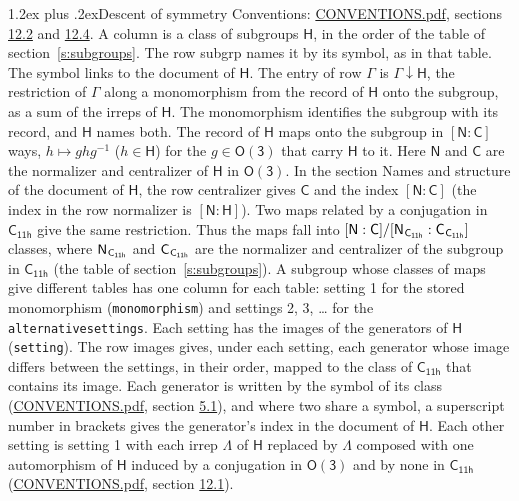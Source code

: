 \documentclass[10pt,a4paper]{article}
\makeatletter
\renewcommand\section{\@startsection{section}{1}{\z@}{-3ex plus -1ex minus -.2ex}%
  {1.2ex plus .2ex}{\normalfont\large\sffamily\bfseries\color{parttitle}}}
\numberwithin{equation}{section}
\newcommand{\grp}[1]{\mathsf{#1}}
\newcommand{\grpindex}[2]{[#1 : #2]}
\newcommand{\restr}[2]{#1\!\downarrow#2}
\newcommand{\hairsp}{\mkern1mu}
\makeatother
\begin{document}
\section{Descent of symmetry}\label{s:subduction}
Conventions: \href{../../CONVENTIONS.pdf}{CONVENTIONS.pdf}, sections \href{../../CONVENTIONS.pdf\#conv.12.2}{12.2} and \href{../../CONVENTIONS.pdf\#conv.12.4}{12.4}.
A column is a class of subgroups $\grp{H}$, in the order of the table of section~\ref{s:subgroups}. The row subgrp names it by its symbol, as in that table. The symbol links to the document of $\grp{H}$. The entry of row $\Gamma$ is $\restr{\Gamma}{\grp{H}}$, the restriction of $\Gamma$ along a monomorphism from the record of $\grp{H}$ onto the subgroup, as a sum of the irreps of $\grp{H}$. The monomorphism identifies the subgroup with its record, and $\grp{H}$ names both. \label{n:group.normalizer.o3}\label{n:group.centralizer.o3}The record of $\grp{H}$ maps onto the subgroup in $\grpindex{\grp{N}}{\grp{C}}$ ways, $h \mapsto g h g^{-1}$ ($h \in \grp{H}$) for the $g \in \grp{O(3)}$ that carry $\grp{H}$ to it. Here $\grp{N}$ and $\grp{C}$ are the normalizer and centralizer of $\grp{H}$ in \href{O3.pdf}{$\grp{O(3)}$}. In the section Names and structure of the document of $\grp{H}$, the row centralizer gives $\grp{C}$ and the index $\grpindex{\grp{N}}{\grp{C}}$ (the index in the row normalizer is $\grpindex{\grp{N}}{\grp{H}}$). Two maps related by a conjugation in $\grp{C_{11h}}$ give the same restriction. Thus the maps fall into $\grpindex{\grp{N}}{\grp{C}}/\grpindex{\grp{N}_{\hairsp \grp{C_{11h}}}}{\grp{C}_{\hairsp \grp{C_{11h}}}}$ classes, where $\grp{N}_{\hairsp \grp{C_{11h}}}$ and $\grp{C}_{\hairsp \grp{C_{11h}}}$ are the normalizer and centralizer of the subgroup in $\grp{C_{11h}}$ (the table of section~\ref{s:subgroups}). \label{n:head.setting}A subgroup whose classes of maps give different tables has one column for each table: setting 1 for the stored monomorphism (\texttt{monomorphism}) and settings 2, 3, \dots{} for the \texttt{alternativesettings}. Each setting has the images of the generators of $\grp{H}$ (\texttt{setting}). \label{n:head.images}The row images gives, under each setting, each generator whose image differs between the settings, in their order, mapped to the class of $\grp{C_{11h}}$ that contains its image. Each generator is written by the symbol of its class (\href{../../CONVENTIONS.pdf}{CONVENTIONS.pdf}, section \href{../../CONVENTIONS.pdf\#conv.5.1}{5.1}), and where two share a symbol, a superscript number in brackets gives the generator's index in the document of $\grp{H}$. \label{n:irrep.Delta}Each other setting is setting 1 with each irrep $\Lambda$ of $\grp{H}$ replaced by $\Lambda$ composed with one automorphism of $\grp{H}$ induced by a conjugation in \href{O3.pdf}{$\grp{O(3)}$} and by none in $\grp{C_{11h}}$ (\href{../../CONVENTIONS.pdf}{CONVENTIONS.pdf}, section \href{../../CONVENTIONS.pdf\#conv.12.1}{12.1}).
\end{document}
